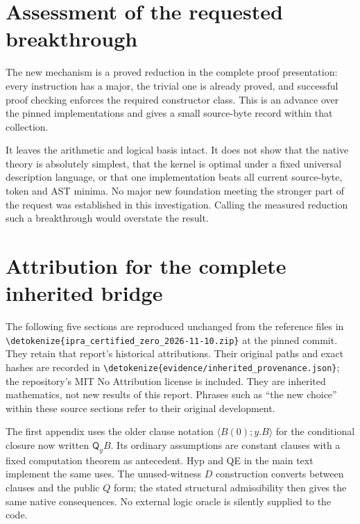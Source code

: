 \documentclass[11pt,letterpaper]{article}
\theoremstyle{definition}\newtheorem{definition}[theorem]{Definition}
\theoremstyle{remark}\newtheorem{remark}[theorem]{Remark}
\newcommand{\Q}{\mathsf Q}
\newcommand{\file}[1]{\expandafter\nolinkurl\expandafter{\detokenize{#1}}}
\begin{document}
\section{Assessment of the requested breakthrough}

The new mechanism is a proved reduction in the complete proof
presentation: every instruction has a major, the trivial one is already
proved, and successful proof checking enforces the required constructor
class. This is an advance over the pinned implementations and gives a
small source-byte record within that collection.

It leaves the arithmetic and logical basis intact. It does not show
that the native theory is absolutely simplest, that the kernel is
optimal under a fixed universal description language, or that one
implementation beats all current source-byte, token and AST minima.
No major new foundation meeting the stronger part of the request was
established in this investigation. Calling the measured reduction such
a breakthrough would overstate the result.

\appendix
\clearpage
\section*{Attribution for the complete inherited bridge}
The following five sections are reproduced unchanged from the reference
files in \file{ipra_certified_zero_2026-11-10.zip} at the pinned commit.
They retain that report's historical attributions. Their original paths
and exact hashes are recorded in \file{evidence/inherited_provenance.json};
the repository's MIT No Attribution license is included. They are
inherited mathematics, not new results of this report. Phrases such as
``the new choice'' within these source sections refer to their original
development.

The first appendix uses the older clause notation
\(\langle B(0);y.B\rangle\) for the conditional closure now written
\(\Q_yB\). Its ordinary assumptions are constant clauses with a fixed
computation theorem as antecedent. Hyp and QE in the main text implement
the same uses. The unused-witness \(D\) construction converts between
clauses and the public \(Q\) form; the stated structural admissibility
then gives the same native consequences. No external logic oracle is
silently supplied to the code.


\end{document}
